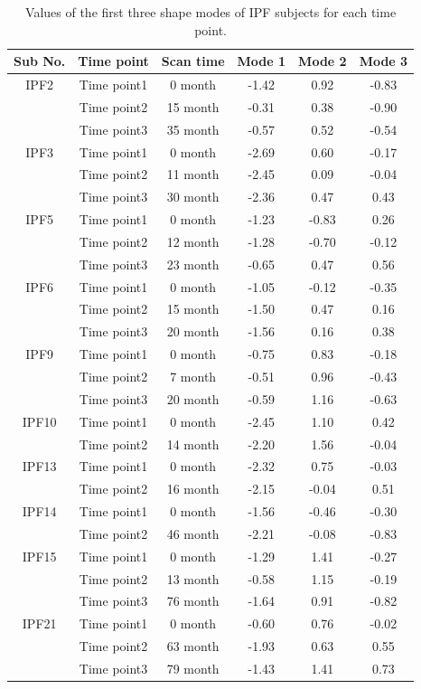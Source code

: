 \begin{table}[htbp]
\centering
\caption{Values of the first three shape modes of IPF subjects for each time point.}
\label{tab:ShapeModeValue}
\begin{tabular}{c c c c c c}
\hline
\bf{Sub No.} & \bf{Time point} & \bf{Scan time}	& \bf{Mode 1} & \bf{Mode 2} & \bf{Mode 3}\\ 
\hline
IPF2 & Time point1 &	0 month &	-1.42 &	0.92 & -0.83\\
\quad & Time point2 &	15 month &	-0.31 &	0.38 & -0.90\\
\quad & Time point3 &	35 month &	-0.57 &	0.52 & -0.54\\
\hline
IPF3 & Time point1 &	0 month &	-2.69 &	0.60 & -0.17\\
\quad & Time point2 &	11 month &	-2.45 &	0.09 & -0.04\\
\quad & Time point3 &	30 month &	-2.36 &	0.47 & 0.43\\
\hline
IPF5 & Time point1 &  0 month & -1.23 & -0.83 & 0.26\\ 		
\quad & Time point2 & 12 month & -1.28 & -0.70 & -0.12\\ 		
\quad & Time point3 & 23 month & -0.65 & 0.47 & 0.56\\  		
\hline
IPF6 & Time point1 &	0 month &	-1.05 &	-0.12 & -0.35\\  		
\quad & Time point2 &	15 month &	-1.50 &	0.47 & 0.16\\  		
\quad & Time point3 &	20 month &	-1.56 &	0.16 & 0.38\\  		
\hline
IPF9 & Time point1 &	0 month &	-0.75 &	0.83 & -0.18\\
\quad & Time point2 &	7 month &	-0.51 &	0.96 & -0.43\\
\quad & Time point3 &	20 month &	-0.59 &	1.16 & -0.63\\
\hline
IPF10 & Time point1 &	0 month &	-2.45 &	1.10 & 0.42\\
\quad & Time point2 &	14 month &	-2.20 &	1.56 & -0.04\\
\hline
IPF13 & Time point1 &	0 month &	-2.32 &	0.75 & -0.03\\
\quad & Time point2 &	16 month &	-2.15 &	-0.04 & 0.51\\
\hline
IPF14 & Time point1 &	0 month &	-1.56 &	-0.46 & -0.30\\
\quad & Time point2 &	46 month &	-2.21 &	-0.08 & -0.83\\
\hline
IPF15 & Time point1 &	0 month &	-1.29 &	1.41 & -0.27\\
\quad & Time point2 &	13 month &	-0.58 &	1.15 & -0.19\\
\quad & Time point3 &	76 month &	-1.64 &	0.91 & -0.82\\
\hline
IPF21 & Time point1 &	0 month &	-0.60 &	0.76 & -0.02\\
\quad & Time point2 &	63 month &	-1.93 &	0.63 & 0.55\\
\quad & Time point3 &	79 month &	-1.43 &	1.41 & 0.73\\
\hline
\end{tabular}
\end{table}

